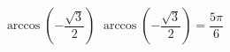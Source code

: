  {$\arccos \left( -\dfrac{\sqrt{3}}{2} \right)$}
{ $\arccos \left( -\dfrac{\sqrt{3}}{2} \right) = \dfrac{5\pi}{6}$}
